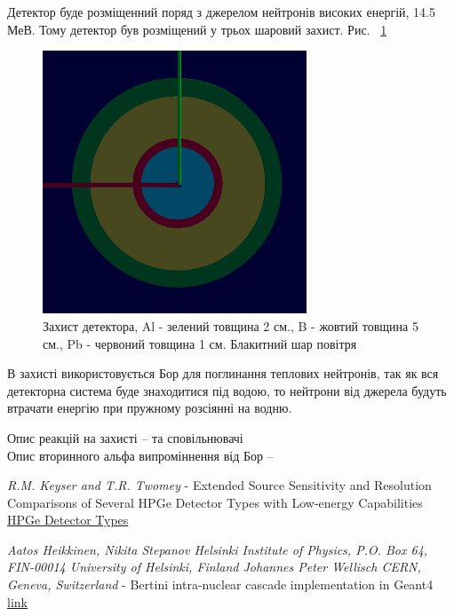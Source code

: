 \documentclass[a4paper, 14pt]{article}
\numberwithin{equation}{section}
\numberwithin{table}{section}
\begin{document}
	\newpage
	Детектор буде розміщенний поряд з джерелом нейтронів високих енергій, 14.5 МеВ. Тому детектор був розміщений у трьох шаровий захист. Рис. ~\ref{ris:s_detector_P}
	
	\begin{figure}[hbt!]
		\centering \includegraphics[width=0.7\textwidth]{images/dectorPrt.png}
		\caption{Захист детектора, Al - зелений товщина 2 см., B - жовтий товщина 5 см., Pb - червоний товщина 1 см. Блакитний шар повітря} 
		\label{ris:s_detector_P}	
	\end{figure} 

	В захисті використовується Бор для поглинання теплових нейтронів, так як вся детекторна система буде знаходитися під водою, то нейтрони від джерела будуть втрачати енергію при пружному розсіянні на водню. 
	
	Опис реакцій на захисті -- та сповільнювачі \\
	Опис вторинного альфа випроміннення від Бор --

\newpage
\begin{thebibliography}{}
	
	 \textit{R.M. Keyser and T.R. Twomey} - Extended Source Sensitivity and Resolution Comparisons of Several HPGe Detector Types with Low-energy Capabilities \\
	\href{https://www.ortec-online.com/-/media/ametekortec/technical%20papers/high%20purity%20germanium%20detector%20applications%20and%20technology%20developements/extended-source-sensitivity-resolution-comparisons-several-hpge-detector-types-low-energy-capabilities.pdf?la=en}{ HPGe Detector Types}
		
	 \textit{Aatos Heikkinen, Nikita Stepanov Helsinki Institute of Physics, P.O. Box 64, FIN-00014 University of Helsinki, Finland Johannes Peter Wellisch CERN, Geneva, Switzerland} - Bertini intra-nuclear cascade implementation in Geant4
	\href{https://www.slac.stanford.edu/econf/C0303241/proc/papers/MOMT008.PDF}{link}
	
\end{thebibliography}
\end{document}
